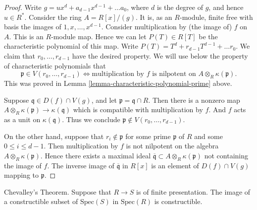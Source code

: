 \begin{proof}
Write $g = ux^d + a_{d-1}x^{d-1} + \ldots a_0$, where
$d$ is the degree of $g$, and hence $u \in R^*$.
Consider the ring $A = R[x]/(g)$.
It is, as an $R$-module, finite free with basis the images
of $1, x, \ldots, x^{d-1}$. Consider multiplication
by (the image of) $f$ on $A$. This is an $R$-module map.
Hence we can let $P(T) \in R[T]$ be the characteristic polynomial
of this map. Write $P(T) = T^d + r_{d-1} T^{d-1} + \ldots r_0$.
We claim that $r_0, \ldots, r_{d-1}$ have the desired property.
We will use below the property of characteristic polynomials
that
$$
\mathfrak p \in V(r_0, \ldots, r_{d-1})
\Leftrightarrow
\text{multiplication by }f\text{ is nilpotent on }
A\otimes_R \kappa(\mathfrak p).
$$
This was proved in Lemma \ref{lemma-characteristic-polynomial-prime} above.

\medskip\noindent
Suppose $\mathfrak q\in D(f) \cap V(g)$, and let
$\mathfrak p = \mathfrak q \cap R$. Then there is a nonzero map
$A\otimes_R \kappa(\mathfrak p) \to \kappa(\mathfrak q)$ which
is compatible with multiplication by $f$.
And $f$ acts as a unit on $\kappa(\mathfrak q)$.
Thus we conclude $\mathfrak p \not \in  V(r_0, \ldots, r_{d-1})$.

\medskip\noindent
On the other hand, suppose that $r_i \not\in \mathfrak p$ for some
prime $\mathfrak p$ of $R$ and some $0 \leq i \leq d - 1$.
Then multiplication by $f$ is not nilpotent on the algebra
$A \otimes_R \kappa(\mathfrak p)$.
Hence there exists a maximal ideal $\overline{\mathfrak q} \subset
A \otimes_R \kappa(\mathfrak p)$ not containing the image of $f$.
The inverse image of $\overline{\mathfrak q}$ in $R[x]$
is an element of $D(f) \cap V(g)$ mapping to $\mathfrak p$.
\end{proof}

\begin{theorem}
\label{theorem-chevalley}
Chevalley's Theorem.
Suppose that $R \to S$ is of finite presentation.
The image of a constructible subset of
$\text{Spec}(S)$ in $\text{Spec}(R)$ is constructible.
\end{theorem}

